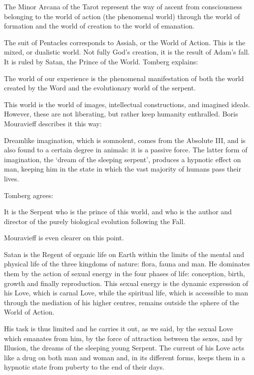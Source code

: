 \begin{quotex}
The Minor Arcana of the Tarot represent the way of ascent from consciousness belonging to the world of action (the phenomenal world) through the world of formation and the world of creation to the world of emanation.
\end{quotex}


The suit of Pentacles corresponds to Assiah, or the World of Action. This is the mixed, or dualistic world. Not fully God's creation, it is the result of Adam's fall. It is ruled by Satan, the Prince of the World. Tomberg explains:

\begin{quotex}
The world of our experience is the phenomenal manifestation of both the world created by the Word and the evolutionary world of the serpent.
\end{quotex}


This world is the world of images, intellectual constructions, and imagined ideals. However, these are not liberating, but rather keep humanity enthralled. Boris Mouravieff describes it this way:

\begin{quotex}
Dreamlike imagination, which is somnolent, comes from the Absolute III, and is also found to a certain degree in animals: it is a passive force. The latter form of imagination, the `dream of the sleeping serpent', produces a hypnotic effect on man, keeping him in the state in which the vast majority of humans pass their lives.
\end{quotex}


Tomberg agrees:

\begin{quotex}
It is the Serpent who is the prince of this world, and who is the author and director of the purely biological evolution following the Fall.
\end{quotex}


Mouravieff is even clearer on this point.

\begin{quotationx} 

Satan is the Regent of organic life on Earth within the limits of the mental and physical life of the three kingdoms of nature: flora, fauna and man. He dominates them by the action of sexual energy in the four phases of life: conception, birth, growth and finally reproduction. This sexual energy is the dynamic expression of his Love, which is carnal Love, while the spiritual life, which is accessible to man through the mediation of his higher centres, remains outside the sphere of the World of Action.

His task is thus limited and he carries it out, as we said, by the sexual Love which emanates from him, by the force of attraction between the sexes, and by Illusion, the dreams of the sleeping young Serpent. The current of his Love acts like a drug on both man and woman and, in its different forms, keeps them in a hypnotic state from puberty to the end of their days.
\end{quotationx}


